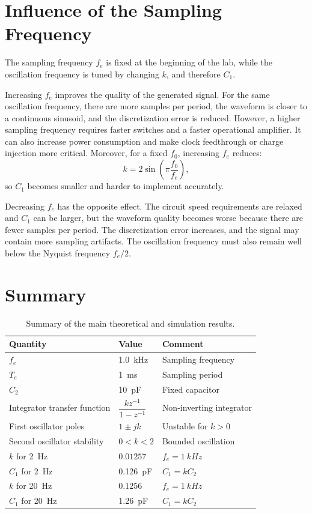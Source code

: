 \documentclass[11pt,a4paper]{article}
\begin{document}
\section{Influence of the Sampling Frequency}

The sampling frequency $f_e$ is fixed at the beginning of the lab, while the oscillation frequency is tuned by changing $k$, and therefore $C_1$.

Increasing $f_e$ improves the quality of the generated signal. For the same oscillation frequency, there are more samples per period, the waveform is closer to a continuous sinusoid, and the discretization error is reduced. However, a higher sampling frequency requires faster switches and a faster operational amplifier. It can also increase power consumption and make clock feedthrough or charge injection more critical. Moreover, for a fixed $f_0$, increasing $f_e$ reduces:
\[
k=2\sin\left(\pi\frac{f_0}{f_e}\right),
\]
so $C_1$ becomes smaller and harder to implement accurately.

Decreasing $f_e$ has the opposite effect. The circuit speed requirements are relaxed and $C_1$ can be larger, but the waveform quality becomes worse because there are fewer samples per period. The discretization error increases, and the signal may contain more sampling artifacts. The oscillation frequency must also remain well below the Nyquist frequency $f_e/2$.

\section{Summary}

\begin{table}[H]
\centering
\begin{tabular}{lll}
\toprule
Quantity & Value & Comment \\
\midrule
$f_e$ & \SI{1.0}{kHz} & Sampling frequency \\
$T_e$ & \SI{1}{ms} & Sampling period \\
$C_2$ & \SI{10}{pF} & Fixed capacitor \\
Integrator transfer function & $\dfrac{kz^{-1}}{1-z^{-1}}$ & Non-inverting integrator \\
First oscillator poles & $1\pm jk$ & Unstable for $k>0$ \\
Second oscillator stability & $0<k<2$ & Bounded oscillation \\
$k$ for \SI{2}{Hz} & $0.01257$ & $f_e=\SI{1}{kHz}$ \\
$C_1$ for \SI{2}{Hz} & \SI{0.126}{pF} & $C_1=kC_2$ \\
$k$ for \SI{20}{Hz} & $0.1256$ & $f_e=\SI{1}{kHz}$ \\
$C_1$ for \SI{20}{Hz} & \SI{1.26}{pF} & $C_1=kC_2$ \\
\bottomrule
\end{tabular}
\caption{Summary of the main theoretical and simulation results.}
\end{table}
\end{document}
